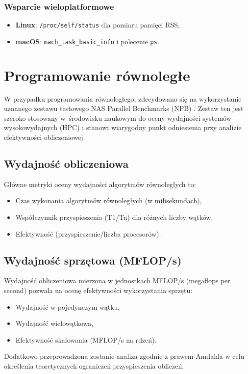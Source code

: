 \subsubsection{Wsparcie wieloplatformowe}
\begin{itemize}
    \item \textbf{Linux}: \texttt{/proc/self/status} dla pomiaru pamięci RSS,
    \item \textbf{macOS}: \texttt{mach\_task\_basic\_info} i polecenie \texttt{ps}.
\end{itemize}

\section{Programowanie równoległe}
W przypadku programowania równoległego, zdecydowano się na wykorzystanie uznanego zestawu testowego NAS Parallel Benchmarks (NPB) \cite{nasaParallelBenchmarks}. Zestaw ten jest szeroko stosowany w~środowisku naukowym do oceny wydajności systemów wysokowydajnych (HPC) i stanowi wiarygodny punkt odniesienia przy analizie efektywności obliczeniowej.
\subsection{Wydajność obliczeniowa}
Główne metryki oceny wydajności algorytmów równoległych to:
\begin{itemize}
\item Czas wykonania algorytmów równoległych (w milisekundach),
\item Współczynnik przyspieszenia (T1/Tn) dla różnych liczby wątków,
\item Efektywność (przyspieszenie/liczba procesorów).
\end{itemize}

\subsection{Wydajność sprzętowa (MFLOP/s)}
Wydajność obliczeniowa mierzona w jednostkach MFLOP/s (megaflops per second) pozwala na ocenę efektywności wykorzystania sprzętu:
\begin{itemize}
\item Wydajność w pojedynczym wątku,
\item Wydajność wielowątkowa,
\item Efektywność skalowania (MFLOP/s na rdzeń).
\end{itemize}
Dodatkowo przeprowadzona zostanie analiza zgodnie z prawem Amdahla w celu określenia teoretycznych ograniczeń przyspieszenia obliczeń.

